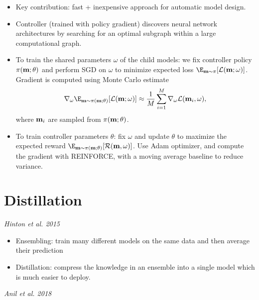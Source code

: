 \begin{itemize}
  \item Key contribution: fast + inexpensive approach for automatic model design.
  \item Controller (trained with policy gradient) discovers neural network architectures by searching for an optimal subgraph within a large computational graph.
  \item To train the shared parameters $\omega$ of the child models: we fix controller policy $\pi(\mathbf{m}; \theta)$ and perform SGD on $\omega$ to minimize expected loss $\E_{\mbf{m} \sim \pi} [\mathcal{L} (\mbf{m}; \omega)]$.  Gradient is computed using Monte Carlo estimate
   \[ 
     \nabla_{\omega} \E_{\mbf{m} \sim \pi (\mbf{m}; \theta)} [\mathcal{L} (\mbf{m}; \omega)] \approx \frac{1}{M} \sum_{i=1}^{M} \nabla_{\omega} \mathcal{L}(\mbf{m}_i, \omega),
   \]
   where $\mathbf{m}_i$ are sampled from $\pi(\mathbf{m}; \theta)$.

 \item To train controller parameters $\theta$: fix $\omega$ and update $\theta$ to maximize the expected reward $\E_{\mbf{m} \sim \pi (\mbf{m}; \theta)} [\mathcal{R}(\mbf{m}, \omega)]$.  Use Adam optimizer, and compute the gradient with REINFORCE, with a moving average baseline to reduce variance.
\end{itemize}

\section{Distillation}

{\it Hinton et al. 2015}~\cite{hinton2015distilling}

\begin{itemize}
  \item Ensembling: train many different models on the same data and then average their prediction
  \item Distillation: compress the knowledge in an ensemble into a single model which is much easier to deploy.
\end{itemize}

{\it Anil et al. 2018}~\cite{anil2018large}

